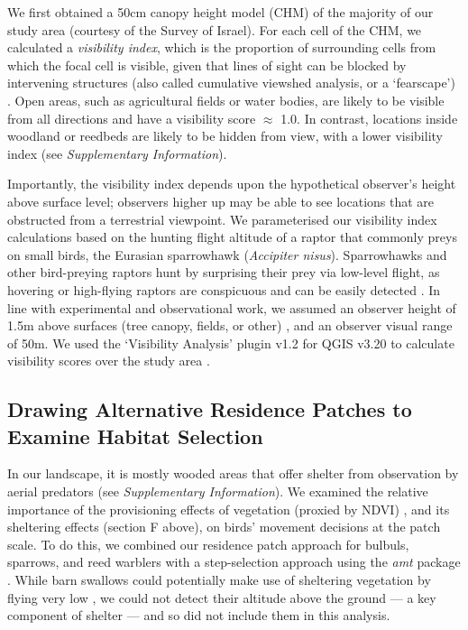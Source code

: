 We first obtained a 50cm canopy height model (CHM) \citep{aben2021} of the majority of our study area (courtesy of the Survey of Israel).
For each cell of the CHM, we calculated a \textit{visibility index}, which is the proportion of surrounding cells from which the focal cell is visible, given that lines of sight can be blocked by intervening structures (also called cumulative viewshed analysis, or a `fearscape') \parencite{olsoy2015}.
Open areas, such as agricultural fields or water bodies, are likely to be visible from all directions and have a visibility score $\approx$ 1.0.
In contrast, locations inside woodland or reedbeds are likely to be hidden from view, with a lower visibility index (see \textit{Supplementary Information}).


Importantly, the visibility index depends upon the hypothetical observer's height above surface level; observers higher up may be able to see locations that are obstructed from a terrestrial viewpoint.
We parameterised our visibility index calculations based on the hunting flight altitude of a raptor that commonly preys on small birds, the Eurasian sparrowhawk (\textit{Accipiter nisus}).
Sparrowhawks and other bird-preying raptors hunt by surprising their prey via low-level flight, as hovering or high-flying raptors are conspicuous and can be easily detected \parencite{krams2001,krams2020}.
In line with experimental and observational work, we assumed an observer height of 1.5m above surfaces (tree canopy, fields, or other) \citep{seress2011,krams2020}, and an observer visual range of 50m.
We used the `Visibility Analysis' plugin v1.2 for QGIS v3.20 to calculate visibility scores over the study area \citep{cuckovic2016}.

\subsection*{Drawing Alternative Residence Patches to Examine Habitat Selection}

In our landscape, it is mostly wooded areas that offer shelter from observation by aerial predators (see \textit{Supplementary Information}).
We examined the relative importance of the provisioning effects of vegetation (proxied by NDVI) \parencite{pettorelli2011}, and its sheltering effects (section F above), on birds' movement decisions at the patch scale.
To do this, we combined our residence patch approach for bulbuls, sparrows, and reed warblers with a step-selection approach \citep{thurfjell2014,avgar2016} using the \textit{amt} package \citep{signer2019}.
While barn swallows could potentially make use of sheltering vegetation by flying very low \parencite{warrick2016}, we could not detect their altitude above the ground --- a key component of shelter --- and so did not include them in this analysis.

